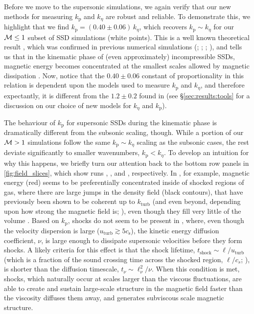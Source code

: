 Before we move to the supersonic simulations, we again verify that our new methods for measuring $k_\mathrm{p}$ and $k_\eta$ are robust and reliable. To demonstrate this, we highlight that we find $k_\mathrm{p} = (0.40 \pm 0.06)\, k_\eta$, which recovers $k_\mathrm{p} \sim k_\eta$ for our $\mathcal{M} \leq 1$ subset of SSD simulations (white points). This is a well known theoretical result \citep[\eg][]{schekochihin2002spectra}, which was confirmed in previous numerical simulations (\citealt{schekochihin2004simulations}; \citealt{haugen2004simulations}; ; \citealt{brandenburg2023dissipative}), and tells us that in the kinematic phase of (even approximately) incompressible SSDs, magnetic energy becomes concentrated at the smallest scales allowed by magnetic dissipation \citep[\eg][]{schekochihin2002spectra, Xu2016_dynamo, kriel2022fundamental, brandenburg2023dissipative}. Now, notice that the $0.40 \pm 0.06$ constant of proportionality in this relation is dependent upon the models used to measure $k_\mathrm{p}$ and $k_\eta$, and therefore expectantly, it is different from the $1.2 \pm 0.2$ found in  (see \S\ref{sec:results:tools} for a discussion on our choice of new models for $k_\eta$ and $k_\mathrm{p}$).

The behaviour of $k_\mathrm{p}$ for supersonic SSDs during the kinematic phase is dramatically different from the subsonic scaling, though. While a portion of our $\mathcal{M} > 1$ simulations follow the same $k_\mathrm{p} \sim k_\eta$ scaling as the subsonic cases, the rest deviate significantly to smaller wavenumbers, \viz $k_\mathrm{p} < k_\eta$. To develop an intuition for why this happens, we briefly turn our attention back to the bottom row panels in \autoref{fig:field_slices}, which show runs , , and , respectively. In , for example, magnetic energy (red) seems to be preferentially concentrated inside of shocked regions of gas, where there are large jumps in the density field (black contours), that have previously been shown to be coherent up to $k_\mathrm{turb}$ (and even beyond, depending upon how strong the magnetic field is;  \citealt{beattie2020filaments,Beattie2021_multi_shock_model}), even though they fill very little of the volume \citep[e.g.,][]{Hopkins2013_s_pdf, Robertson2018_dense_regions, Mocz2019_s_pdf, Beattie2022_spdf}. Based on $k_\mathrm{p}$, shocks do not seem to be present in , where, even though the velocity dispersion is large ($u_\mathrm{turb} \gtrsim 5 c_\mathrm{s}$), the kinetic energy diffusion coefficient, $\nu$, is large enough to dissipate supersonic velocities before they form shocks. A likely criteria for this effect is that the shock lifetime, $t_\mathrm{shock} \sim \ell/u_\mathrm{turb}$ (which is a fraction of the sound crossing time across the shocked region, $\ell/c_s$; \citealt{Robertson2018_dense_regions}), is shorter than the diffusion timescale, $t_\nu \sim \ell_\nu^2 / \nu$. When this condition is met, shocks, which naturally occur at scales larger than the viscous fluctuations, are able to create and sustain large-scale structure in the magnetic field faster than the viscosity diffuses them away, and generates subviscous scale magnetic structure.

